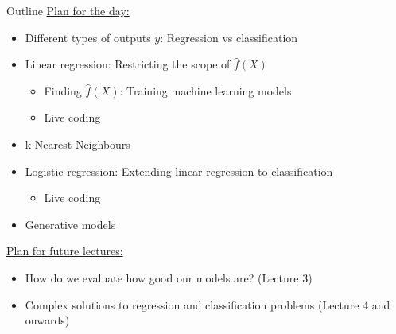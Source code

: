 \documentclass[10pt]{beamer}
\begin{document}
    \begin{frame}[t]{Outline}
        \underline{Plan for the day:}
        \begin{itemize}
            \item Different types of outputs $y$: Regression vs classification
            \item Linear regression: Restricting the scope of $\hat{f}(X)$
            \begin{itemize}
                \item Finding $\hat{f}(X)$: Training machine learning models
                \item Live coding
            \end{itemize}
            \item k Nearest Neighbours
            \item Logistic regression: Extending linear regression to classification
            \begin{itemize}
                \item Live coding
            \end{itemize}
            \item Generative models
        \end{itemize}

        \underline{Plan for future lectures:}
        \begin{itemize}
            \item How do we evaluate how good our models are? (Lecture 3)
            \item Complex solutions to regression and classification problems (Lecture 4 and onwards)
        \end{itemize}
    \end{frame}

    \newcommand{\weightnode}[3]{
        \node[circle, draw=black, fill=teal!60, opacity=#3] at (#1, #2*3.5) {};
    }
\end{document}
